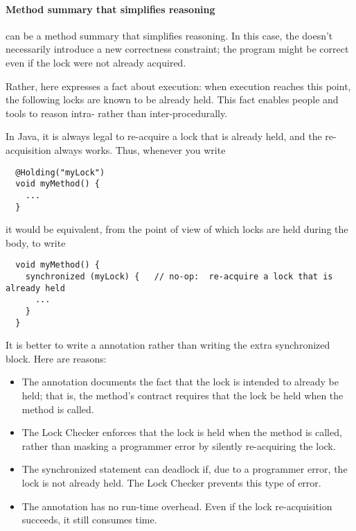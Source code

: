 \paragraph{Method summary that simplifies reasoning\label{lock-checker-holding-method-summary}}

   can be a method summary that simplifies reasoning.  In
  this case, the  doesn't necessarily introduce a new
  correctness constraint; the program might be correct even if the lock
  were not already acquired.

  Rather, here  expresses a fact about execution:  when
  execution reaches this point, the following locks are known to be already held.  This
  fact enables people and tools to reason intra- rather than
  inter-procedurally.

  In Java, it is always legal to re-acquire a lock that is already held,
  and the re-acquisition always works.  Thus, whenever you write

\begin{Verbatim}
  @Holding("myLock")
  void myMethod() {
    ...
  }
\end{Verbatim}

\noindent
it would be equivalent, from the point of view of which locks are held
during the body, to write

\begin{Verbatim}
  void myMethod() {
    synchronized (myLock) {   // no-op:  re-acquire a lock that is already held
      ...
    }
  }
\end{Verbatim}


It is better to write a  annotation rather than writing the
extra synchronized block.  Here are reasons:

\begin{itemize}
\item
  The annotation documents the fact that the lock is intended to already be
  held;  that is, the method's contract requires that the lock be held when
  the method is called.
\item
  The Lock Checker enforces that the lock is held when the method is
  called, rather than masking a programmer error by silently re-acquiring
  the lock.
\item
  The synchronized statement can deadlock if, due to a programmer error,
  the lock is not already held.  The Lock Checker prevents this type of
  error.
\item
  The annotation has no run-time overhead.  Even if the lock re-acquisition
  succeeds, it still consumes time.
\end{itemize}


